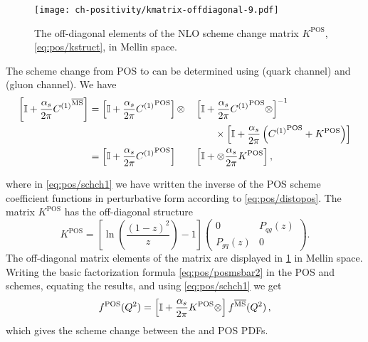 \begin{figure}[t]
  \begin{center}
    \texttt{[image: ch-positivity/kmatrix-offdiagonal-9.pdf]}
    \caption{\small The off-diagonal  elements of the NLO scheme
      change matrix $K^{\textrm{POS}}$, \cref{eq:pos/kstruct}, in Mellin space.
    \label{fig:pos/kmat} }
  \end{center}
\end{figure}
The scheme change from POS to \msbar{} can be determined using
 (quark channel) and
 (gluon channel).
We have
\begin{alignat}{2}
  \label{eq:pos/schch0}
\left[\mathbb{I}
+\frac{\alpha_s}{2\pi} {C^{(1)}}^{{\overline{\textrm{MS}}}}\right]&=
  \left[\mathbb{I} +\frac{\alpha_s}{2\pi} {C^{(1)}}^{\textrm{POS}}\right]\otimes
  &&\left[\mathbb{I} + \frac{\alpha_s}{2\pi} {C^{(1)}}^{\textrm{POS}}\otimes\right]^{-1}
  \nonumber\\
  & &&\qquad\times\left[\mathbb{I} +\frac{\alpha_s}{2\pi}  
    \left({C^{(1)}}^{\textrm{POS}} + K^{\textrm{POS}} \right)
  \right]\\
&=\left[\mathbb{I}
  +\frac{\alpha_s}{2\pi} {C^{(1)}}^{\textrm{POS}}
  \right]
  &&\left[\mathbb{I} + \otimes \frac{\alpha_s}{2\pi}  K^{\textrm{POS}}\right]
  , \label{eq:pos/schch1}
\end{alignat}

where in \cref{eq:pos/schch1} we have written the inverse of the
POS scheme coefficient functions in perturbative form according to
\cref{eq:pos/distopos}. The matrix  $K^{\textrm{POS}}$ has the
off-diagonal structure
\begin{equation}\label{eq:pos/kstruct}
  K^{\textrm{POS}}=\left[\ln\left(\frac{(1-z)^2}{z}\right) - 1\right]
  \left(\begin{array}{cc} 0 & P_{qg}(z) \\
  P_{gq}(z) & 0\end{array}\right).
\end{equation}
The off-diagonal matrix elements of the matrix are displayed in
\cref{fig:pos/kmat} in Mellin space. 
Writing the basic factorization formula \cref{eq:pos/posmsbar2} in
the POS and \msbar{} schemes, equating the results, and using
\cref{eq:pos/schch1} we get
\begin{align}
  \label{eq:pos/schch}
 f^{\textrm{POS}}(Q^2)=\left[\mathbb{I}
  +\frac{\alpha_s}{2\pi}  K^{\textrm{POS}}\otimes\right] f^{{\overline{\textrm{MS}}}}(Q^2)\,,
\end{align}
which gives the scheme change between the \msbar{} and POS PDFs. 

